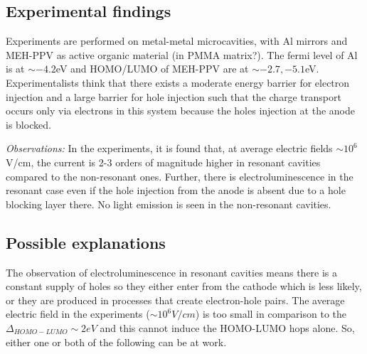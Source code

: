 \documentclass[a4paper,twocolumn]{revtex4-1} %
\begin{document}
\subsection{Experimental findings}
Experiments are performed on metal-metal microcavities, with Al mirrors and MEH-PPV as active organic material (in PMMA matrix?). 
The fermi level of Al is at $\sim -4.2$eV and 
HOMO/LUMO of MEH-PPV are at $\sim -2.7,-5.1$eV.
Experimentalists think that there exists a moderate energy barrier for electron injection and a large barrier for hole injection such that the charge transport occurs only via electrons in this system because the holes injection at the anode is blocked.

{\it Observations:}
In the experiments, it is found that, at average electric fields $\sim 10^6$V/cm, the current is 2-3 orders of magnitude higher in resonant cavities compared to the non-resonant ones. Further, there is electroluminescence in the resonant case even if the hole injection from the anode is absent due to a hole blocking layer there. No light emission is seen in the non-resonant cavities.

\subsection{Possible explanations}
\label{subsec:zener}
The observation of electroluminescence in resonant cavities means there is a constant supply of holes so they either enter from the cathode which is less likely, or they are produced in processes that create electron-hole pairs.
The average electric field in the experiments ($\sim 10^6 V/cm$) 
is too small in comparison to the 
$\Delta_{HOMO-LUMO}\sim 2eV$
 and this cannot induce the HOMO-LUMO hops alone.
 So, either one or both of the following can be at work.
 
\end{document}
